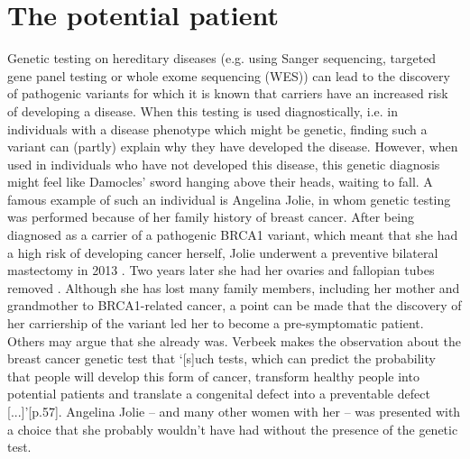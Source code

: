 \section{The potential patient}
Genetic testing on hereditary diseases (e.g. using Sanger sequencing, targeted gene panel testing or whole exome sequencing (WES)) can lead to the discovery of pathogenic variants for which it is known that carriers have an increased risk of developing a disease. 
When this testing is used diagnostically, i.e. in individuals with a disease phenotype which might be genetic, finding such a variant can (partly) explain why they have developed the disease. 
However, when used in individuals who have not developed this disease, this genetic diagnosis might feel like Damocles’ sword hanging above their heads, waiting to fall. 
A famous example of such an individual is Angelina Jolie, in whom genetic testing was performed because of her family history of breast cancer. 
After being diagnosed as a carrier of a pathogenic BRCA1 variant, which meant that she had a high risk of developing cancer herself, Jolie underwent a preventive bilateral mastectomy in 2013 \cite{Nabi_2017}. 
Two years later she had her ovaries and fallopian tubes removed \cite{Vicari_2017}. 
Although she has lost many family members, including her mother and grandmother to BRCA1-related cancer, a point can be made that the discovery of her carriership of the variant led her to become a pre-symptomatic patient. 
Others may argue that she already was. 
Verbeek makes the observation about the breast cancer genetic test that ‘[s]uch tests, which can predict the probability that people will develop this form of cancer, transform healthy people into potential patients and translate a congenital defect into a preventable defect [...]’\cite{Verbeek_2011}[p.57]. 
Angelina Jolie – and many other women with her – was presented with a choice that she probably wouldn’t have had without the presence of the genetic test. 

